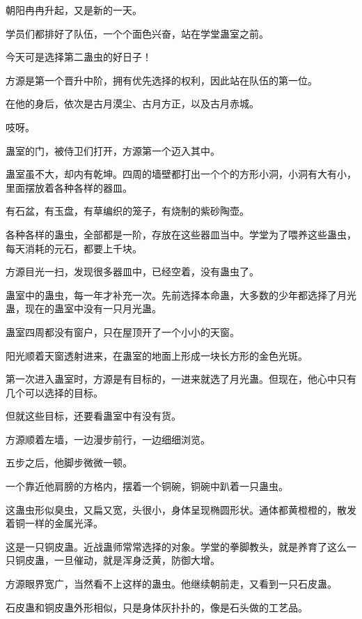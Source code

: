 
\begin{this_body}

朝阳冉冉升起，又是新的一天。

学员们都排好了队伍，一个个面色兴奋，站在学堂蛊室之前。

今天可是选择第二蛊虫的好日子！

方源是第一个晋升中阶，拥有优先选择的权利，因此站在队伍的第一位。

在他的身后，依次是古月漠尘、古月方正，以及古月赤城。

吱呀。

蛊室的门，被侍卫们打开，方源第一个迈入其中。

蛊室虽不大，却内有乾坤。四周的墙壁都打出一个个的方形小洞，小洞有大有小，里面摆放着各种各样的器皿。

有石盆，有玉盘，有草编织的笼子，有烧制的紫砂陶壶。

各种各样的蛊虫，全部都是一阶，存放在这些器皿当中。学堂为了喂养这些蛊虫，每天消耗的元石，都要上千块。

方源目光一扫，发现很多器皿中，已经空着，没有蛊虫了。

蛊室中的蛊虫，每一年才补充一次。先前选择本命蛊，大多数的少年都选择了月光蛊，现在的蛊室中没有一只月光蛊。

蛊室四周都没有窗户，只在屋顶开了一个小小的天窗。

阳光顺着天窗透射进来，在蛊室的地面上形成一块长方形的金色光斑。

第一次进入蛊室时，方源是有目标的，一进来就选了月光蛊。但现在，他心中只有几个可以选择的目标。

但就这些目标，还要看蛊室中有没有货。

方源顺着左墙，一边漫步前行，一边细细浏览。

五步之后，他脚步微微一顿。

一个靠近他肩膀的方格内，摆着一个铜碗，铜碗中趴着一只蛊虫。

这蛊虫形似臭虫，又扁又宽，头很小，身体呈现椭圆形状。通体都黄橙橙的，散发着铜一样的金属光泽。

这是一只铜皮蛊。近战蛊师常常选择的对象。学堂的拳脚教头，就是养育了这么一只铜皮蛊，一旦催动，就是浑身泛黄，防御大增。

方源眼界宽广，当然看不上这样的蛊虫。他继续朝前走，又看到一只石皮蛊。

石皮蛊和铜皮蛊外形相似，只是身体灰扑扑的，像是石头做的工艺品。


\end{this_body}
